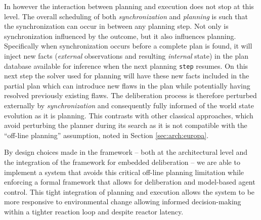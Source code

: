 In \rx however the interaction between planning and execution does not
stop at this level. The overall scheduling of both {\em
  synchronization} and {\em planning} is such that the synchronization
can occur in between any planning step. Not only is synchronization
influenced by the outcome, but it also influences planning.
Specifically when synchronization occurs before a complete plan is
found, it will inject new facts ({\em external} observations and
resulting {\em internal} state) in the plan database available for
inference when the next planning \texttt{step} resumes. On this next
step the \eu solver used for planning will have these new facts
included in the partial plan which can introduce new flaws in the plan
while potentially having resolved previously existing flaws. The
deliberation process is therefore perturbed externally by {\em
  synchronization} and consequently fully informed of the world state
evolution as it is planning. This contrasts with other classical
approaches, which avoid perturbing the planner during its search as it
is not compatible with the ``off-line planning'' assumption, noted in
Section \ref{sec:arch:europa}.

By design choices made in the \rx framework -- both at the
architectural level and the integration of the \eu framework for
embedded deliberation -- we are able to implement a system that avoids
this critical off-line planning limitation while enforcing a formal
framework that allows for deliberation and model-based agent control.
This tight integration of planning and execution allows the system to
be more responsive to environmental change allowing informed
decision-making within a tighter reaction loop and despite reactor
latency.








